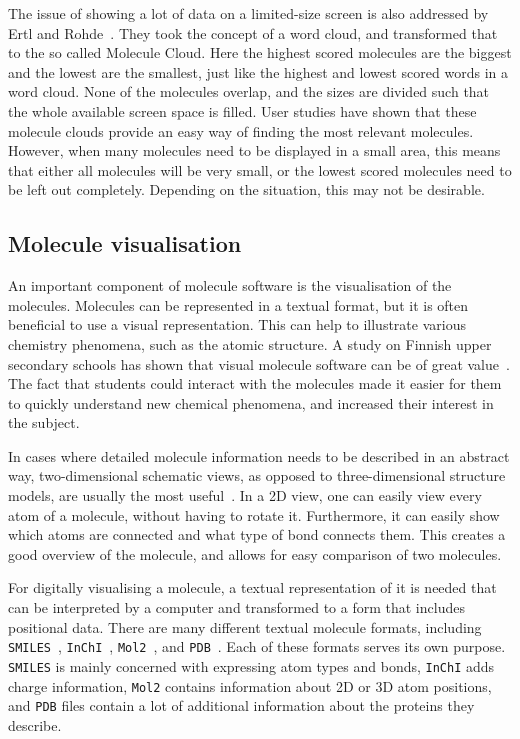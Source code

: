 The issue of showing a lot of data on a limited-size screen is also addressed by Ertl and Rohde~\cite{ertl2012molecule}. They took the concept of a word cloud, and transformed that to the so called Molecule Cloud. Here the highest scored molecules are the biggest and the lowest are the smallest, just like the highest and lowest scored words in a word cloud. None of the molecules overlap, and the sizes are divided such that the whole available screen space is filled. User studies have shown that these molecule clouds provide an easy way of finding the most relevant molecules. However, when many molecules need to be displayed in a small area, this means that either all molecules will be very small, or the lowest scored molecules need to be left out completely. Depending on the situation, this may not be desirable.

\subsection{Molecule visualisation}
An important component of molecule software is the visualisation of the molecules. Molecules can be represented in a textual format, but it is often beneficial to use a visual representation. This can help to illustrate various chemistry phenomena, such as the atomic structure. A study on Finnish upper secondary schools has shown that visual molecule software can be of great value~\cite{aksela2008computer}. The fact that students could interact with the molecules made it easier for them to quickly understand new chemical phenomena, and increased their interest in the subject.

In cases where detailed molecule information needs to be described in an abstract way, two-dimensional schematic views, as opposed to three-dimensional structure models, are usually the most useful~\cite{zhou2009molecular}. In a 2D view, one can easily view every atom of a molecule, without having to rotate it. Furthermore, it can easily show which atoms are connected and what type of bond connects them. This creates a good overview of the molecule, and allows for easy comparison of two molecules.

For digitally visualising a molecule, a textual representation of it is needed that can be interpreted by a computer and transformed to a form that includes positional data. There are many different textual molecule formats, including \verb|SMILES|~\cite{daylight1992daylight}, \verb|InChI|~\cite{heller2013inchi}, \verb|Mol2|~\cite{tripos2005tripos}, and \verb|PDB|~\cite{bernstein1977protein}. Each of these formats serves its own purpose. \verb|SMILES| is mainly concerned with expressing atom types and bonds, \verb|InChI| adds charge information, \verb|Mol2| contains information about 2D or 3D atom positions, and \verb|PDB| files contain a lot of additional information about the proteins they describe.

